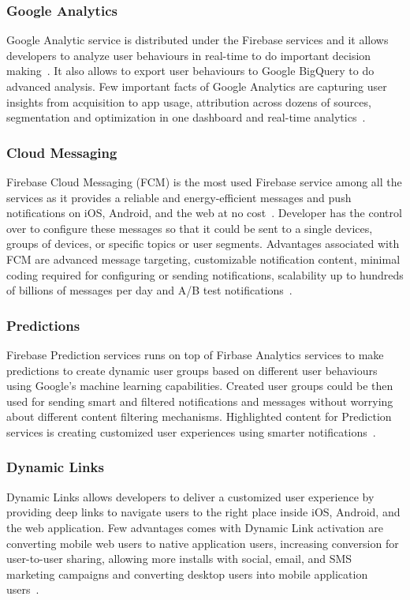 \subsubsection{Google Analytics} Google Analytic service is distributed under
the Firebase services and it allows developers to analyze user behaviours in
real-time to do important decision making~\cite{hid-sp18-409-www-firebase}. It
also allows to export user behaviours to Google BigQuery to do advanced
analysis. Few important facts of Google Analytics are capturing user insights
from acquisition to app usage, attribution across dozens of sources,
segmentation and optimization in one dashboard and real-time
analytics~\cite{hid-sp18-409-www-firebase-products}.

\subsubsection{Cloud Messaging} Firebase Cloud Messaging (FCM) is the most used
Firebase service among all the services as it provides a reliable and
energy-efficient messages and push notifications on iOS, Android, and the web at
no cost~\cite{hid-sp18-409-www-firebase-products}. Developer has the control
over to configure these messages so that it could be sent to a single devices,
groups of devices, or specific topics or user segments. Advantages associated
with FCM are advanced message targeting, customizable notification content,
minimal coding required for configuring or sending notifications, scalability up
to hundreds of billions of messages per day and A/B test
notifications~\cite{hid-sp18-409-www-firebase-merged,
	hid-sp18-409-www-firebase-products}.

\subsubsection{Predictions} Firebase Prediction services runs on top of Firbase
Analytics services to make predictions to create dynamic user groups based on
different user behaviours using Google's machine learning capabilities. Created
user groups could be then used for sending smart and filtered notifications and
messages without worrying about different content filtering mechanisms.
Highlighted content for Prediction services is creating customized user
experiences using smarter
notifications~\cite{hid-sp18-409-www-firebase-products}.

\subsubsection{Dynamic Links} Dynamic Links allows developers to deliver a
customized user experience by providing deep links to navigate users to the
right place inside iOS, Android, and the web application. Few advantages comes
with Dynamic Link activation are converting mobile web users to native
application users, increasing conversion for user-to-user sharing, allowing more
installs with social, email, and SMS marketing campaigns and converting desktop
users into mobile application users~\cite{hid-sp18-409-www-firebase-wikipedia,
	hid-sp18-409-www-firebase-products}.

